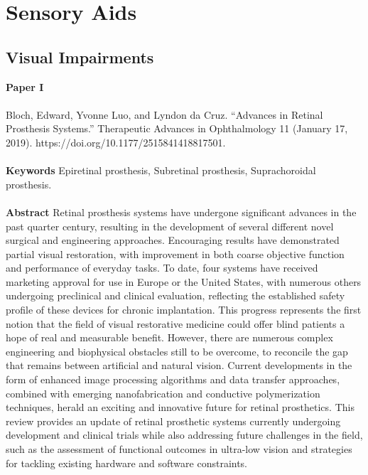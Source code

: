 \section{Sensory Aids}
\subsection{Visual Impairments}

\noindent
\textbf{Paper I} 
\\ \\
\noindent
Bloch, Edward, Yvonne Luo, and Lyndon da Cruz. “Advances in Retinal Prosthesis Systems.” Therapeutic Advances in Ophthalmology 11 (January 17, 2019). https://doi.org/10.1177/2515841418817501.\\ \\

\noindent
\textbf{Keywords} Epiretinal prosthesis, Subretinal prosthesis, Suprachoroidal prosthesis.\\ \\

\noindent
\textbf{Abstract} Retinal prosthesis systems have undergone significant advances in the past quarter century, resulting in the development of several different novel surgical and engineering approaches. Encouraging results have demonstrated partial visual restoration, with improvement in both coarse objective function and performance of everyday tasks. To date, four systems have received marketing approval for use in Europe or the United States, with numerous others undergoing preclinical and clinical evaluation, reflecting the established safety profile of these devices for chronic implantation. This progress represents the first notion that the field of visual restorative medicine could offer blind patients a hope of real and measurable benefit. However, there are numerous complex engineering and biophysical obstacles still to be overcome, to reconcile the gap that remains between artificial and natural vision. Current developments in the form of enhanced image processing algorithms and data transfer approaches, combined with emerging nanofabrication and conductive polymerization techniques, herald an exciting and innovative future for retinal prosthetics. This review provides an update of retinal prosthetic systems currently undergoing development and clinical trials while also addressing future challenges in the field, such as the assessment of functional outcomes in ultra-low vision and strategies for tackling existing hardware and software constraints. \\ \\

